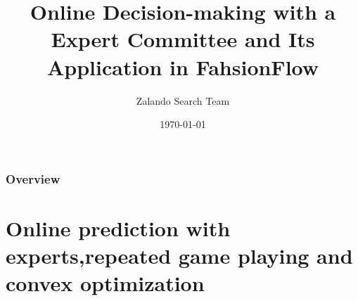 \documentclass{beamer}
\title[Online Decision-making]{Online Decision-making with a Expert Committee and Its Application in FahsionFlow} %
\author{Zalando Search Team} %
\institute[Zalando SE] %
{
Zalando SE \\ %
\medskip
\textit{hanchen.xiong@zalando.de} %
}
\date{\today} %
\begin{document}
\begin{frame}
\titlepage %
\end{frame}

\begin{frame}
\frametitle{Overview} %
\tableofcontents %
\end{frame}


\section[Online prediction with experts, games, convex optimization]{Online prediction with experts,repeated game playing and convex optimization}        %
\end{document}
